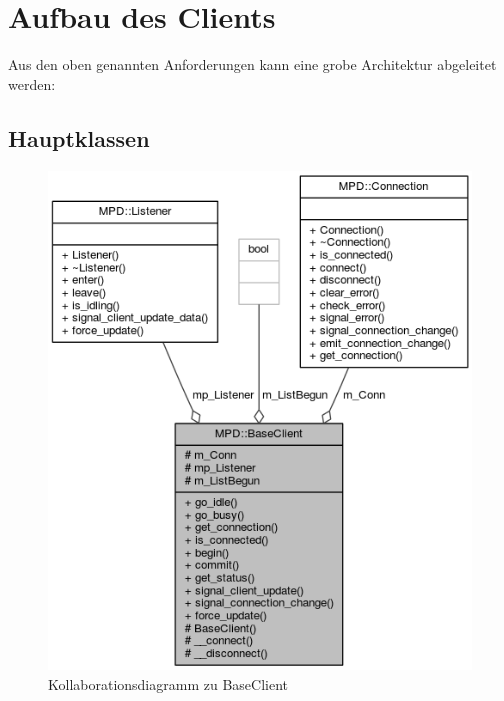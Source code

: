 \section{Aufbau des Clients}

Aus den oben genannten Anforderungen kann eine grobe Architektur abgeleitet werden:


\subsection{Hauptklassen}

\begin{figure}[htb!]
	\centering
        \includegraphics[scale=0.55]{BaseClientCollab.png}
	\caption{Kollaborationsdiagramm zu BaseClient}
	\label{collab_base_client}
\end{figure}

